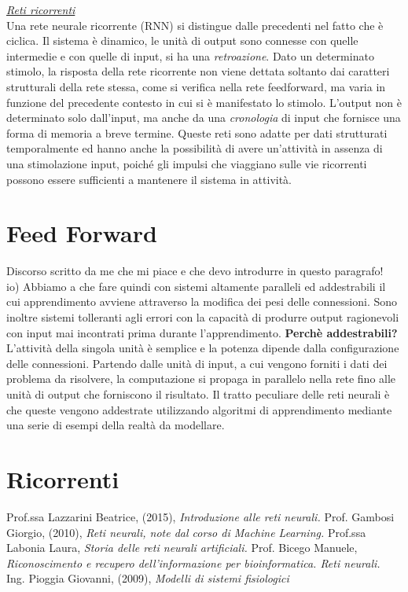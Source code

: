\documentclass[12pt,a4paper,oneside]{book}
\begin{document}
		
		\underline{\emph{Reti ricorrenti}}\\
		Una rete neurale ricorrente (RNN) si distingue dalle precedenti nel fatto che è ciclica. Il sistema è dinamico, le unità di output sono connesse con quelle intermedie e con quelle di input, si ha una \emph{retroazione}. Dato un determinato stimolo, la risposta della rete ricorrente non viene dettata soltanto dai caratteri strutturali della rete stessa, come si verifica nella rete feedforward, ma varia in funzione del precedente contesto in cui si è manifestato lo stimolo. L'output non è determinato solo dall'input, ma anche da una \emph{cronologia} di input che fornisce una forma di memoria a breve termine. Queste reti sono adatte per dati strutturati temporalmente ed hanno anche la possibilità di avere un’attività in assenza di una stimolazione input, poiché gli impulsi che viaggiano sulle vie ricorrenti possono essere sufficienti a mantenere il sistema in attività.
	
	
	
	
	\chapter{Feed Forward}
	Discorso scritto da me che mi piace e che devo introdurre in questo paragrafo!\\
	io) Abbiamo a che fare quindi con sistemi altamente paralleli ed addestrabili il cui apprendimento avviene attraverso la modifica dei pesi delle connessioni. Sono inoltre sistemi tolleranti agli errori con la capacità di produrre output ragionevoli con input mai incontrati prima durante l'apprendimento. \textbf{Perchè addestrabili?} L'attività della singola unità è semplice e la potenza dipende dalla configurazione delle connessioni.
	Partendo dalle unità di input, a cui vengono forniti i dati dei problema da risolvere, la computazione si propaga in parallelo nella rete fino alle unità di output che forniscono il risultato.
	Il tratto peculiare delle reti neurali è che queste vengono addestrate utilizzando algoritmi di apprendimento mediante una serie di esempi della realtà da modellare.
	
	\chapter{Ricorrenti}

\clearpage 
\begin{thebibliography}{9} 
	 Prof.ssa Lazzarini Beatrice, (2015), \emph{Introduzione alle reti neurali.}
	 Prof. Gambosi Giorgio, (2010), \emph{Reti neurali, note dal corso di Machine Learning.}
	 Prof.ssa Labonia Laura, \emph{Storia delle reti neurali artificiali.}
	 Prof. Bicego Manuele, \emph{Riconoscimento e recupero dell’informazione per bioinformatica. Reti neurali.}
	 Ing. Pioggia Giovanni, (2009), \emph{Modelli di sistemi fisiologici}
 \end{thebibliography}
	
\end{document}
